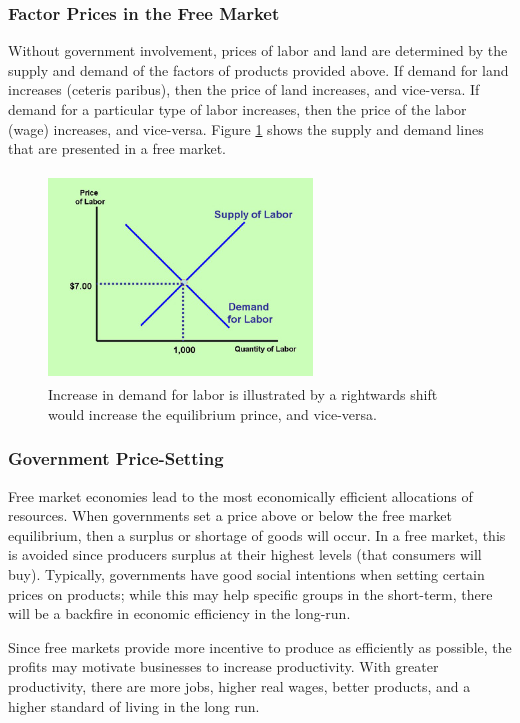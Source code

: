 \documentclass[a4paper, 12pt] {article}
\begin{document}
\subsubsection{Factor Prices in the Free Market}
Without government involvement, prices of labor and land are determined by the
supply and demand of the factors of products provided above. If demand for land
increases (ceteris paribus), then the price of land increases, and vice-versa.
If demand for a particular type of labor increases, then the price of the labor
(wage) increases, and vice-versa. Figure \ref{fig:free_market_dia} shows the
supply and demand lines that are presented in a free market.

\begin{figure}[ht]
    \centering
    \includegraphics[height=5.5cm, width=7cm]{factors_of_free_market.jpg}
    \caption{Increase in demand for labor is illustrated by a rightwards shift
    would increase the equilibrium prince, and vice-versa.}
    \label{fig:free_market_dia}
\end{figure}

\subsubsection{Government Price-Setting}
Free market economies lead to the most economically efficient allocations of 
resources. When governments set a price above or below the free market equilibrium,
then a surplus or shortage of goods will occur. In a free market, this is avoided
since producers surplus at their highest levels (that consumers will buy). Typically,
governments have good social intentions when setting certain prices on products;
while this may help specific groups in the short-term, there will be a backfire
in economic efficiency in the long-run.

Since free markets provide more incentive to produce as efficiently as possible,
the profits may motivate businesses to increase productivity. With greater
productivity, there are more jobs, higher real wages, better products, and a
higher standard of living in the long run.
\end{document}
